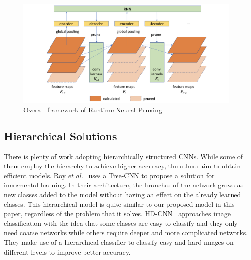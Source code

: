 \begin{figure}
    \centering
    \includegraphics[width=\textwidth]{thesis/images/runtimenp-fig.png}
    \caption{Overall framework of Runtime Neural Pruning~\cite{Lin2017RuntimeNP}}
    \label{fig:runtimenp}
\end{figure}

\subsection{Hierarchical Solutions}

There is plenty of work adopting hierarchically structured CNNs. 
While some of them employ the hierarchy to achieve higher accuracy, the others aim to obtain efficient models.
Roy \emph{et al.}~\cite{roy2018tree} uses a Tree-CNN to propose a solution for incremental learning. 
In their architecture, the branches of the network grows as new classes added to the model without having an effect on the already learned classes. 
This hierarchical model is quite similar to our proposed model in this paper, regardless of the problem that it solves. 
HD-CNN~\cite{Yan_2015_ICCV} approaches image classification with the idea that some classes are easy to classify and they only need coarse networks while others require deeper and more complicated networks. 
They make use of a hierarchical classifier to classify easy and hard images on different levels to improve better accuracy. 


